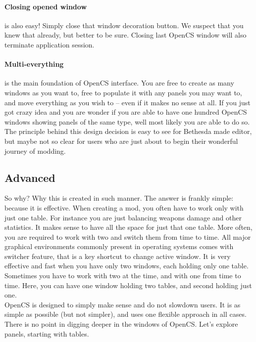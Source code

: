 \paragraph{Closing opened window}
is also easy! Simply close that window decoration button. We suspect that you knew that already, but better to be sure. Closing last Open{CS} window will also terminate application session.

\paragraph{Multi-everything}
is the main foundation of Open{CS} interface. You are free to create as many windows as you want to, free to populate it with any panels you may want to, and move everything as you wish to -- even if it makes no sense at all. If you just got crazy idea and you are wonder if you are able to have one hundred Open{CS} windows showing panels of the same type, well most likely you are able to do so.\\

The principle behind this design decision is easy to see for Bethesda made editor, but maybe not so clear for users who are just about to begin their wonderful journey of modding.\\

\subsection{Advanced}
So why? Why this is created in such manner. The answer is frankly simple: because it is effective. When creating a mod, you often have to work only with just one table. For instance you are just balancing weapons damage and other statistics. It makes sense to have all the space for just that one table. More often, you are required to work with two and switch them from time to time. All major graphical environments commonly present in operating systems comes with switcher feature, that is a key shortcut to change active window. It is very effective and fast when you have only two windows, each holding only one table. Sometimes you have to work with two at the time, and with one from time to time. Here, you can have one window holding two tables, and second holding just one.\\

Open{CS} is designed to simply make sense and do not slowdown users. It is as simple as possible (but not simpler), and uses one flexible approach in all cases.\\

There is no point in digging deeper in the windows of Open{CS}. Let's explore panels, starting with tables.

